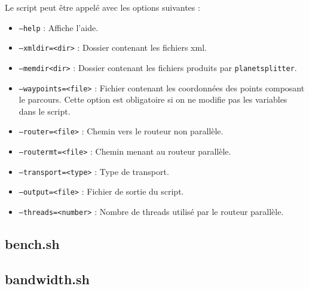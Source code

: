 \begin{appendices}
  Le script peut être appelé avec les options suivantes : \\
  \begin{itemize}
    \item \texttt{--help} : Affiche l'aide.
    \item \texttt{--xmldir=<dir>} : Dossier contenant les fichiers xml.
    \item \texttt{--memdir<dir>} : Dossier contenant les fichiers produits
      par \texttt{planetsplitter}.
    \item \texttt{--waypoints=<file>} : Fichier contenant les coordonnées des 
      points composant le parcours. Cette option est obligatoire si on ne 
      modifie pas les variables dans le script.
    \item \texttt{--router=<file>} : Chemin vers le routeur non parallèle.
    \item \texttt{--routermt=<file>} : Chemin menant au routeur parallèle.
    \item \texttt{--transport=<type>} : Type de transport.
    \item \texttt{--output=<file>} : Fichier de sortie du script.
    \item \texttt{--threads=<number>} : Nombre de threads utilisé par le routeur
      parallèle.
  \end{itemize}

  \subsection{bench.sh}

  \subsection{bandwidth.sh}
\end{appendices}
